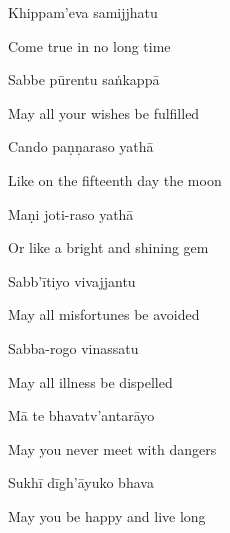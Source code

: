 Khippam'eva samijjhatu

\begin{english}
  Come true in no long time
\end{english}

Sabbe pūrentu saṅkappā

\begin{english}
  May all your wishes be fulfilled
\end{english}

Cando paṇṇaraso yathā

\begin{english}
  Like on the fifteenth day the moon
\end{english}

Maṇi joti-raso yathā\makeatletter\hyperlink{endnote116-appendix}\makeatother

\begin{english}
  Or like a bright and shining gem\\
\end{english}

Sabb'ītiyo vivajjantu\makeatletter\hyperlink{endnote117-appendix}\makeatother

\begin{english}
  May all misfortunes be avoided
\end{english}

Sabba-rogo vinassatu

\begin{english}
  May all illness be dispelled
\end{english}

Mā te bhavatv'antarāyo

\begin{english}
  May you never meet with dangers
\end{english}

Sukhī dīgh'āyuko bhava

\begin{english}
  May you be happy and live long
\end{english}

